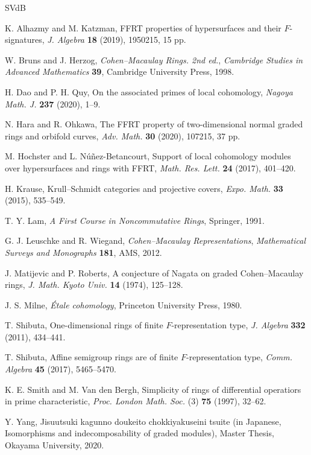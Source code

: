 \documentclass[11pt,leqno]{article}
\theoremstyle{definition}
\theoremstyle{remark}
\theoremstyle{remark}
\begin{document}
\begin{thebibliography}{SVdB}
\def\ji#1#2(#3)#4-#5.{\newblock{\em#1} {\bf#2} (#3), #4--#5.}
\def\GTM#1{Graduate Texts in Math. {\bf #1}, Springer}
\def\SLN#1{Lecture Notes in Math. {\bf #1}, Springer}

  K. Alhazmy and M. Katzman,
  FFRT properties of hypersurfaces and their $F$-signatures,
  {\em J. Algebra} {\bf 18} (2019), 1950215, 15 pp.

  W. Bruns and J. Herzog,
  {\em Cohen--Macaulay Rings. 2nd ed.},
  {\em Cambridge Studies in Advanced Mathematics} {\bf 39},
  Cambridge University Press, 1998.

  H. Dao and P. H. Quy, On the associated primes of local cohomology,
  {\em Nagoya Math. J.} {\bf 237} (2020), 1--9.

  N. Hara and R. Ohkawa,
  The FFRT property of two-dimensional normal graded rings and orbifold curves,
  {\em Adv. Math.} {\bf 30} (2020), 107215, 37 pp.

  M. Hochster and L. N\'u\~nez-Betancourt,
  Support of local cohomology modules over hypersurfaces and rings with FFRT,
  {\em Math. Res. Lett.} {\bf 24} (2017), 401--420.


  H. Krause,
  Krull--Schmidt categories and projective covers,
  {\em Expo. Math.} {\bf 33} (2015), 535--549.

T. Y. Lam,
{\em A First Course in Noncommutative Rings},
Springer, 1991.

  G. J. Leuschke and R. Wiegand,
  {\em Cohen--Macaulay Representations},
  {\em Mathematical Surveys and Monographs} {\bf 181},
  AMS, 2012.

  J. Matijevic and P. Roberts,
  A conjecture of Nagata on graded Cohen--Macaulay rings,
  {\em J. Math. Kyoto Univ.} {\bf 14} (1974), 125--128.

  J. S. Milne, {\em \'Etale cohomology},
  Princeton University Press, 1980.
  
  T. Shibuta,
  One-dimensional rings of finite $F$-representation type,
  {\em J. Algebra} {\bf 332} (2011), 434--441.

  T. Shibuta,
  Affine semigroup rings are of finite $F$-representation type,
  {\em Comm. Algebra} {\bf 45} (2017), 5465--5470.

  K. E. Smith and M. Van den Bergh,
  Simplicity of rings of differential operatiors in prime characteristic,
  {\em Proc. London Math. Soc.} (3) {\bf 75} (1997), 32--62.

  Y. Yang, Jisuutsuki kagunno doukeito chokkiyakuseini
  tsuite (in Japanese, 
  Isomorphisms and indecomposability of graded modules),
  Master Thesis, Okayama University, 2020.

\end{thebibliography}
\end{document}

